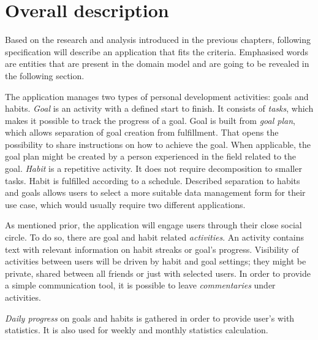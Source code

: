 
\section{Overall description}\label{sec:overall-description}

Based on the research and analysis introduced in the previous chapters, following specification will describe an application that fits the criteria.
Emphasised words are entities that are present in the domain model and are going to be revealed in the following section.

The application manages two types of personal development activities: goals and habits.
\textit{Goal} is an activity with a defined start to finish.
It consists of \textit{tasks}, which makes it possible to track the progress of a goal.
Goal is built from \textit{goal plan}, which allows separation of goal creation from fulfillment.
That opens the possibility to share instructions on how to achieve the goal.
When applicable, the goal plan might be created by a person experienced in the field related to the goal.
\textit{Habit} is a repetitive activity.
It does not require decomposition to smaller tasks.
Habit is fulfilled according to a schedule.
Described separation to habits and goals allows users to select a more suitable data management form for their use case, which would usually require two different applications.

As mentioned prior, the application will engage users through their close social circle.
To do so, there are goal and habit related \textit{activities}.
An activity contains text with relevant information on habit streaks or goal's progress.
Visibility of activities between users will be driven by habit and goal settings;
they might be private, shared between all friends or just with selected users.
In order to provide a simple communication tool, it is possible to leave \textit{commentaries} under activities.

\textit{Daily progress} on goals and habits is gathered in order to provide user's with statistics.
It is also used for weekly and monthly statistics calculation.